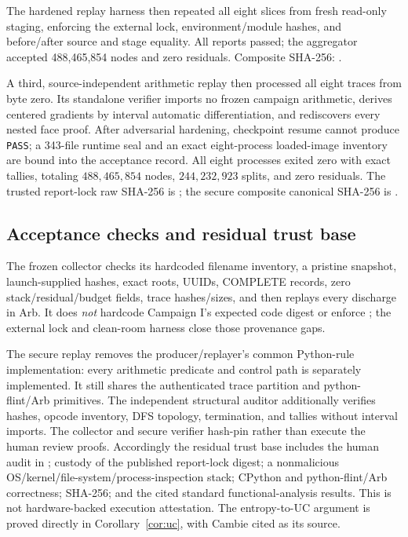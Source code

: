 \documentclass[11pt]{article}
\theoremstyle{plain}
\theoremstyle{definition}
\theoremstyle{remark}
\begin{document}
The hardened replay harness then repeated all eight slices from fresh read-only
staging, enforcing the external lock, environment/module hashes, and
before/after source and stage equality.  All reports passed; the aggregator
accepted 488,465,854 nodes and zero residuals.  Composite SHA-256:
.

A third, source-independent arithmetic replay then processed all eight traces
from byte zero.  Its standalone verifier imports no frozen campaign arithmetic,
derives centered gradients by interval automatic differentiation, and
rediscovers every nested face proof.  After adversarial hardening, checkpoint
resume cannot produce \texttt{PASS}; a 343-file runtime seal and an exact
eight-process loaded-image inventory are bound into the acceptance record.
All eight processes exited zero with exact tallies, totaling
\(488{,}465{,}854\) nodes, \(244{,}232{,}923\) splits, and zero residuals.
The trusted report-lock raw SHA-256 is
;
the secure composite canonical SHA-256 is
.

\subsection{Acceptance checks and residual trust base}
The frozen collector checks its hardcoded filename inventory, a pristine
snapshot, launch-supplied hashes, exact roots, UUIDs, COMPLETE records, zero
stack/residual/budget fields, trace hashes/sizes, and then replays every
discharge in Arb.  It does \emph{not} hardcode Campaign I's expected code
digest or enforce ; the external lock and clean-room
harness close those provenance gaps.

The secure replay removes the producer/replayer's common Python-rule
implementation: every arithmetic predicate and control path is separately
implemented.  It still shares the authenticated trace partition and
python-flint/Arb primitives.  The independent structural auditor additionally
verifies hashes, opcode inventory, DFS topology, termination, and tallies
without interval imports.  The collector and secure verifier hash-pin rather
than execute the human review proofs.  Accordingly the residual trust base
includes the human audit in ; custody of the published
report-lock digest; a nonmalicious OS/kernel/file-system/process-inspection
stack; CPython and python-flint/Arb correctness; SHA-256; and the cited standard
functional-analysis results.  This is not hardware-backed execution
attestation.  The entropy-to-UC argument is proved directly in
Corollary~\ref{cor:uc}, with Cambie cited as its source.
\end{document}
